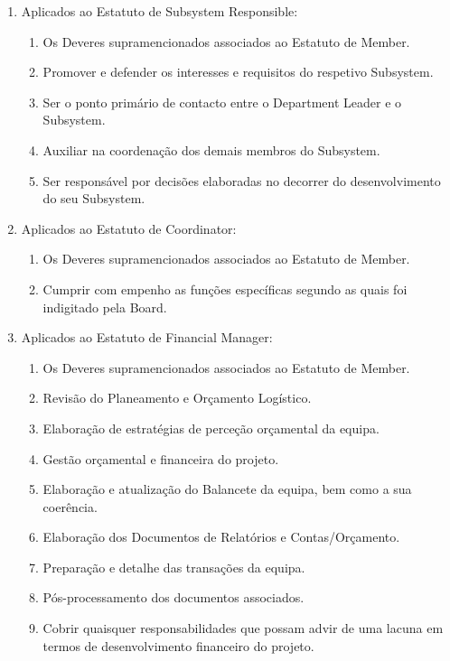 \begin{enumerate}
\begin{enumerate}
    \item Aplicados ao Estatuto de Subsystem Responsible:
    \begin{enumerate}
      \item Os Deveres supramencionados associados ao Estatuto de Member.
      \item Promover e defender os interesses e requisitos do respetivo Subsystem.
      \item Ser o ponto primário de contacto entre o Department Leader e o Subsystem.
      \item Auxiliar na coordenação dos demais membros do Subsystem.
      \item Ser responsável por decisões elaboradas no decorrer do desenvolvimento do seu Subsystem.
    \end{enumerate}

    \item Aplicados ao Estatuto de Coordinator:
    \begin{enumerate}
      \item Os Deveres supramencionados associados ao Estatuto de Member.
      \item Cumprir com empenho as funções específicas segundo as quais foi indigitado pela Board.
    \end{enumerate}

    \item Aplicados ao Estatuto de Financial Manager:
    \begin{enumerate}
      \item Os Deveres supramencionados associados ao Estatuto de Member.
      \item Revisão do Planeamento e Orçamento Logístico.
      \item Elaboração de estratégias de perceção orçamental da equipa.
      \item Gestão orçamental e financeira do projeto.
      \item Elaboração e atualização do Balancete da equipa, bem como a sua coerência.
      \item Elaboração dos Documentos de Relatórios e Contas/Orçamento.
      \item Preparação e detalhe das transações da equipa.
      \item Pós-processamento dos documentos associados.
      \item Cobrir quaisquer responsabilidades que possam advir de uma lacuna em termos de desenvolvimento financeiro do projeto.
    \end{enumerate}


\end{enumerate}
\end{enumerate}
